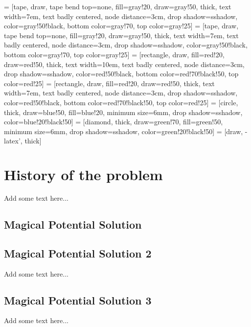 

 = [tape, draw, tape bend top=none, fill=gray!20, draw=gray!50, thick, 
    text width=7em, text badly centered, node distance=3cm, drop shadow={sshadow, color=gray!50!black},
    bottom color=gray!70, top color=gray!25]
 = [tape, draw, tape bend top=none, fill=gray!20, draw=gray!50, thick,
    text width=7em, text badly centered, node distance=3cm, drop shadow={sshadow, color=gray!50!black},
    bottom color=gray!70, top color=gray!25]
 = [rectangle, draw, fill=red!20, draw=red!50, thick,
    text width=10em, text badly centered, node distance=3cm, drop shadow={sshadow, color=red!50!black},
    bottom color=red!70!black!50, top color=red!25]
 = [rectangle, draw, fill=red!20, draw=red!50, thick,
    text width=7em, text badly centered, node distance=3cm, drop shadow={sshadow, color=red!50!black},
    bottom color=red!70!black!50, top color=red!25]
 = [circle, thick, draw=blue!50, fill=blue!20, minimum size=6mm,
    drop shadow={sshadow, color=blue!20!black!50}]
 = [diamond, thick, draw=green!70, fill=green!50, minimum size=6mm,
    drop shadow={sshadow, color=green!20!black!50}]
 = [draw, -latex', thick]

\chapter{History of the problem}
\label{sec:hist}
Add some text here... 
\section{Magical Potential Solution}
\section{Magical Potential Solution 2}
Add some text here... 
\section{Magical Potential Solution 3}
Add some text here... 
